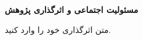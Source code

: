 %
%
%
%
\centerline{\textbf{\LARGE{
مسئولیت اجتماعی و اثرگذاری پژوهش
}}}
\thispagestyle{empty}
\vspace{1cm}

متن اثرگذاری خود را وارد کنید.